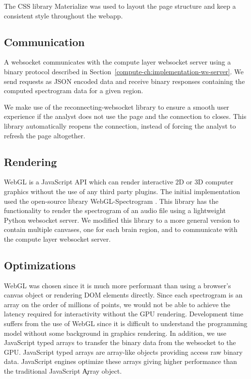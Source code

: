 The CSS library Materialize \cite{materialize} was used to layout the page
structure and keep a consistent style throughout the webapp.

\subsection{Communication}

A websocket communicates with the compute layer websocket server using a binary
protocol described in Section~\ref{compute-ch:implementation-ws-server}. We
send requests as JSON encoded data and receive binary responses containing the
computed spectrogram data for a given region.

We make use of the reconnecting-websocket \cite{reconnecting-websocket} library
to ensure a smooth user experience if the analyst does not use the page and the
connection to closes. This library automatically reopens the connection,
instead of forcing the analyst to refresh the page altogether.

\subsection{Rendering}

WebGL is a JavaScript API which can render interactive 2D or 3D computer
graphics without the use of any third party plugins. The initial implementation
used the open-source library WebGL-Spectrogram \cite{webgl-spectrogram}. This
library has the functionality to render the spectrogram of an audio file using a
lightweight Python websocket server. We modified this library to a more general
version to contain multiple canvases, one for each brain region, and to
communicate with the compute layer websocket server. \\

\subsection{Optimizations}

WebGL was chosen since it is much more performant than using a browser's canvas
object or rendering DOM elements directly. Since each spectrogram is an array
on the order of millions of points, we would not be able to achieve the latency
required for interactivity without the GPU rendering. Development time suffers
from the use of WebGL since it is difficult to understand the programming model
without some background in graphics rendering. In addition, we use JavaScript
typed arrays to transfer the binary data from the websocket to the GPU.
JavaScript typed arrays are array-like objects providing access raw binary
data. JavaScript engines optimize these arrays giving higher performance than
the traditional JavaScript \c{Array} object.


